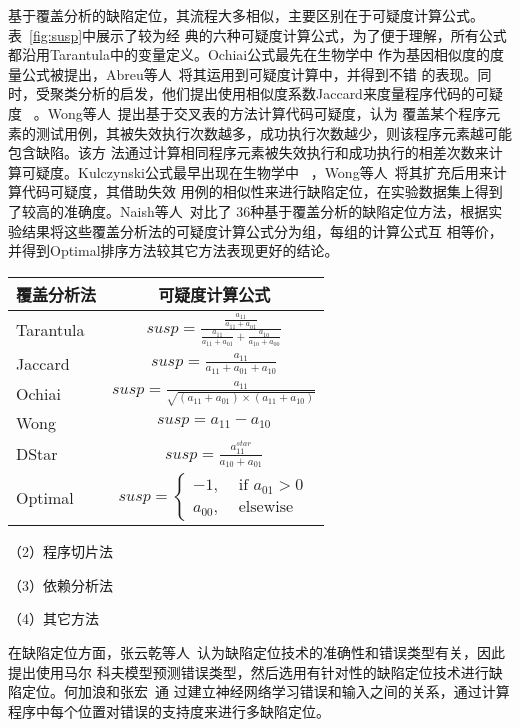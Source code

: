 基于覆盖分析的缺陷定位，其流程大多相似，主要区别在于可疑度计算公式。表~\ref{fig:susp}中展示了较为经
典的六种可疑度计算公式，为了便于理解，所有公式都沿用Tarantula中的变量定义。Ochiai公式最先在生物学中
作为基因相似度的度量公式被提出，Abreu等人~\cite{abreu2007accuracy}将其运用到可疑度计算中，并得到不错
的表现。同时，受聚类分析的启发，他们提出使用相似度系数Jaccard来度量程序代码的可疑度
~\cite{abreu2007accuracy}。Wong等人~\cite{wong2008crosstab}提出基于交叉表的方法计算代码可疑度，认为
覆盖某个程序元素的测试用例，其被失效执行次数越多，成功执行次数越少，则该程序元素越可能包含缺陷。该方
法通过计算相同程序元素被失效执行和成功执行的相差次数来计算可疑度。Kulczynski公式最早出现在生物学中
~\cite{willett2003similarity}，Wong等人~\cite{wong2014dstar}将其扩充后用来计算代码可疑度，其借助失效
用例的相似性来进行缺陷定位，在实验数据集上得到了较高的准确度。Naish等人~\cite{naish2011model}对比了
36种基于覆盖分析的缺陷定位方法，根据实验结果将这些覆盖分析法的可疑度计算公式分为组，每组的计算公式互
相等价，并得到Optimal排序方法较其它方法表现更好的结论。

\begin{center}
\label{fig:susp}
\begin{tabular}{|l|c|}
\hline
覆盖分析法 & 可疑度计算公式 \\ \hline
Tarantula & $susp = \frac{\frac{a_{11}}{a_{11}+a_{01}}}{\frac{a_{11}}{a_{11}+a_{01}}+\frac{a_{10}}{a_{10}+a_{00}}}$\\ \hline
Jaccard & $susp = \frac{a_{11}}{a_{11}+a_{01}+a_{10}}$\\ \hline
Ochiai & $susp = \frac{a_{11}}{\sqrt{(a_{11}+a_{01})\times(a_{11}+a_{10})}}$\\ \hline
Wong & $susp = a_{11}-a_{10}$\\ \hline
DStar & $susp = \frac{a_{11}^{star}}{a_{10}+a_{01}}$\\ \hline
Optimal & $susp = \begin{cases}
  -1, & \text{ if } a_{01}>0 \\ 
  a_{00}, & \text{ elsewise }  
  \end{cases}$\\ \hline
\end{tabular}
\end{center}





（2）程序切片法


（3）依赖分析法

（4）其它方法

在缺陷定位方面，张云乾等人~\cite{malcov2013}认为缺陷定位技术的准确性和错误类型有关，因此提出使用马尔
科夫模型预测错误类型，然后选用有针对性的缺陷定位技术进行缺陷定位。何加浪和张宏~\cite{nnfault2013}通
过建立神经网络学习错误和输入之间的关系，通过计算程序中每个位置对错误的支持度来进行多缺陷定位。

